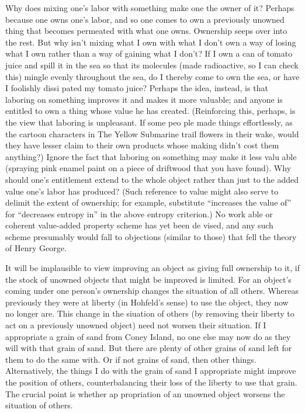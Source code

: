 \documentclass[11pt,openany]{book}
\begin{document}
Why does mixing one's labor with something make one the owner of it? Perhaps because one owns one's labor, and so one comes to own a previously unowned thing that becomes permeated with what one owns. Ownership seeps over into the rest. But why isn't mixing what I own with what I don't own a way of losing what I own rather than a way of gaining what I don't? If I own a can of tomato juice and spill it in the sea so that its molecules (made radioactive, so I can check this) mingle evenly throughout the sea, do I thereby come to own the sea, or have I foolishly dissi pated my tomato juice? Perhaps the idea, instead, is that laboring on something improves it and makes it more valuable; and anyone is entitled to own a thing whose value he has created. (Reinforcing this, perhaps, is the view that laboring is unpleasant. If some peo ple made things effortlessly, as the cartoon characters in The Yellow Submarine trail flowers in their wake, would they have lesser claim to their own products whose making didn't cost them anything?) Ignore the fact that laboring on something may make it less valu able (spraying pink enamel paint on a piece of driftwood that you have found). Why should one's entitlement extend to the whole object rather than just to the added value one's labor has produced? (Such reference to value might also serve to delimit the extent of ownership; for example, substitute ``increases the value of'' for ``decreases entropy in'' in the above entropy criterion.) No work able or coherent value-added property scheme has yet been de vised, and any such scheme presumably would fall to objections (similar to those) that fell the theory of Henry George. 

It will be implausible to view improving an object as giving full ownership to it, if the stock of unowned objects that might be improved is limited. For an object's coming under one person's ownership changes the situation of all others. Whereas previously they were at liberty (in Hohfeld's sense) to use the object, they now no longer are. This change in the siuation of others (by removing their liberty to act on a previously unowned object) need not worsen their situation. If I appropriate a grain of sand from Coney Island, no one else may now do as they will with that grain of sand. But there are plenty of other grains of sand left for them to do the same with. Or if not grains of sand, then other things. Alternatively, the things I do with the grain of sand I appropriate might improve the position of others, counterbalancing their loss of the liberty to use that grain. The crucial point is whether ap propriation of an unowned object worsens the situation of others. 
\end{document}
